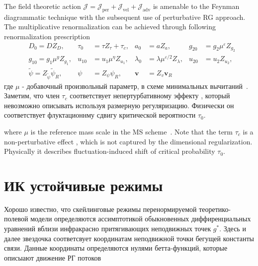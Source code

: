 \documentclass[12pt]{article}
\def\eps{\varepsilon}
\def\mv{{\bm v}}
\def\J{\mathcal{J}}
\def\R{{\scriptscriptstyle R}}
\begin{document}
The field theoretic action ${\J}=\J_{\text{per}} + \J_{\text{vel}} + \J_{\text{adv}}$ is amenable to the Feynman diagrammatic technique with
 the subsequent use of perturbative RG approach.
The multiplicative renormalization can be achieved through following renormalization
prescription 
\begin{align}
   \label{eq:RGconst}
   &D_0 = D Z_D, &\tau_0& = \tau Z_\tau + \tau_c,
     &a_0& = a Z_a,  &g_{20}&=g_2 \mu^{\eps} Z_{g_2}
     \nonumber \\ 
   &g_{10} = g_{1} \mu^{y} Z_{g_1}, &u_{10}& = u_1 \mu^\eta Z_{u_1},
   &\lambda_0& = \lambda \mu^{\eps/2} Z_\lambda, 
   &u_{20}& = u_2 Z_{u_2}, 
   \nonumber \\
   &\tilde{\psi} = Z_{\tilde{\psi}}\tilde\psi_{\R}, &\psi& = Z_\psi \psi_{ \R},
   &\mv& = Z_v{\mv}_{\R} 
\end{align}
где $\mu$ - добавочный произвольный параметр, в схеме минимальных вычитаний~\cite{Zinn}.
Заметим, что член $\tau_c$ соответствует непертурбативному эффекту \cite{JanTau04}, который невозможно описывать используя размерную регуляризацию. 
Физически он соответствует флуктационнму сдвигу критической вероятности $\tau_0$.

where $\mu$ is the reference mass scale in the MS scheme~\cite{Zinn}. Note that
the term $\tau_c$ is a non-perturbative effect \cite{JanTau04}, which
is not captured by the  dimensional regularization. Physically it describes fluctuation-induced
shift of critical probability $\tau_0$. 
{\section{ИК устойчивые режимы} \label{sec:stable}}
Хорошо известно, что скейлинговые режимы перенормируемой теоретико-полевой модели определяются ассимптотикой обыкновенных диффиренциальных уравнений вблизи инфракрасно притягивающих неподвижных точек $g^*$.
Здесь и далее звездочка соответсвует координатам неподвижной точки бегущей константы связи. Данные координаты определяются нулями бетта-функций, которые описыают движение РГ потоков \cite{Vasiliev,Zinn,Amit}
\end{document}
